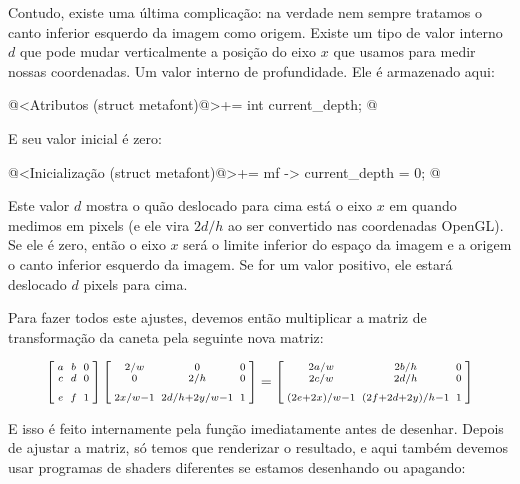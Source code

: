 {{{{{{Contudo, existe uma última complicação: na verdade nem sempre tratamos
o canto inferior esquerdo da imagem como origem. Existe um tipo de
valor interno $d$ que pode mudar verticalmente a posição do eixo $x$
que usamos para medir nossas coordenadas. Um valor interno de
profundidade. Ele é armazenado aqui:

\iniciocodigo
@<Atributos (struct metafont)@>+=
int current_depth;
@
\fimcodigo

E seu valor inicial é zero:

\iniciocodigo
@<Inicialização (struct metafont)@>+=
mf -> current_depth = 0;
@
\fimcodigo

Este valor $d$ mostra o quão deslocado para cima está o eixo $x$ em
quando medimos em pixels (e ele vira $2d/h$ ao ser convertido nas
coordenadas OpenGL). Se ele é zero, então o eixo $x$ será o limite
inferior do espaço da imagem e a origem o canto inferior esquerdo da
imagem. Se for um valor positivo, ele estará deslocado $d$ pixels para
cima. 

Para fazer todos este ajustes, devemos então multiplicar a matriz de
transformação da caneta pela seguinte nova matriz:

$$
\left[{{a \atop c}\atop
      {\atop e}}{{b \atop d}\atop { \atop f}}{{0 \atop 0}\atop{\atop 1}}\right]
\left[{{2/w \atop 0}\atop
      {\atop 2x/w-1}}{{0 \atop 2/h}\atop { \atop
      2d/h+2y/w-1}}{{0 \atop 0}\atop{\atop
      1}}\right]=
\left[{{2a/w \atop 2c/w}\atop
      {\atop (2e+2x)/w-1}}{{2b/h \atop 2d/h}\atop { \atop
      (2f+2d+2y)/h-1}}{{0 \atop 0}\atop{\atop
      1}}\right]
$$

E isso é feito internamente pela função 
imediatamente antes de desenhar. Depois de ajustar a matriz, só temos
que renderizar o resultado, e aqui também devemos usar programas de
shaders diferentes se estamos desenhando ou apagando:

}}}}}}
